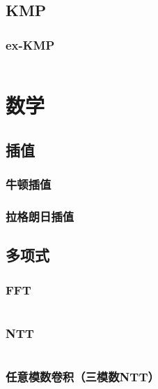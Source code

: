 \documentclass{article}
\begin{document}
\begin{multicols}{2}
			\subsection{KMP}
				

				\subsubsection{ex-KMP}
					\inputminted{cpp}{../src/字符串/exKMP.cpp}
			




		\section{数学}

			\subsection{插值}
				\subsubsection{牛顿插值}


				\subsubsection{拉格朗日插值}

			
			\subsection{多项式}
				\subsubsection{FFT}
					\inputminted{cpp}{../src/数学/FFT.cpp}

				\subsubsection{NTT}
					\inputminted{cpp}{../src/数学/NTT.cpp}

				\subsubsection{任意模数卷积（三模数NTT）}
					\inputminted{cpp}{../src/数学/任意模数卷积.cpp}


\end{multicols}
\end{document}
